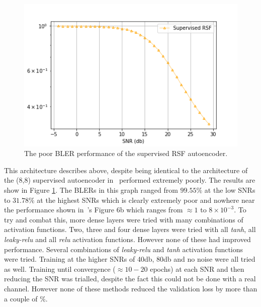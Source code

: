 \documentclass[12pt,onecolumn,letterpaper]{article}
\newcommand{\code}{\textit}
\newcommand\genfigsize{0.5}
\begin{document}
\begin{figure}
   \centering
   \includegraphics[width=\genfigsize\linewidth]{figures/aoudia_paper/autoencoder_rsf_bler.png}
   \caption{The poor BLER performance of the supervised RSF autoencoder.}
   \label{fig:RsfBler}
\end{figure}

This architecture describes above, despite being identical to the architecture of the (8,8) supervised autoencoder in~\cite{Aoudia} performed extremely poorly. The results are show in Figure \ref{fig:RsfBler}. The BLERs in this graph ranged from $99.55\%$ at the low SNRs to $31.78\%$ at the highest SNRs which is clearly extremely poor and nowhere near the performance shown in~\cite{Aoudia}'s Figure 6b which ranges from $\approx1$ to $8\times 10^{-3}$. To try and combat this, more dense layers were tried with many combinations of activation functions. Two, three and four dense layers were tried with all \code{tanh}, all \code{leaky-relu} and all \code{relu} activation functions. However none of these had improved performance. Several combinations of \code{leaky-relu} and \code{tanh} activation functions were tried. Training at the higher SNRs of 40db, 80db and no noise were all tried as well. Training until convergence ($\approx10-20$ epochs) at each SNR and then reducing the SNR was trialled, despite the fact this could not be done with a real channel. However none of these methods reduced the validation loss by more than a couple of $\%$. 
\end{document}
